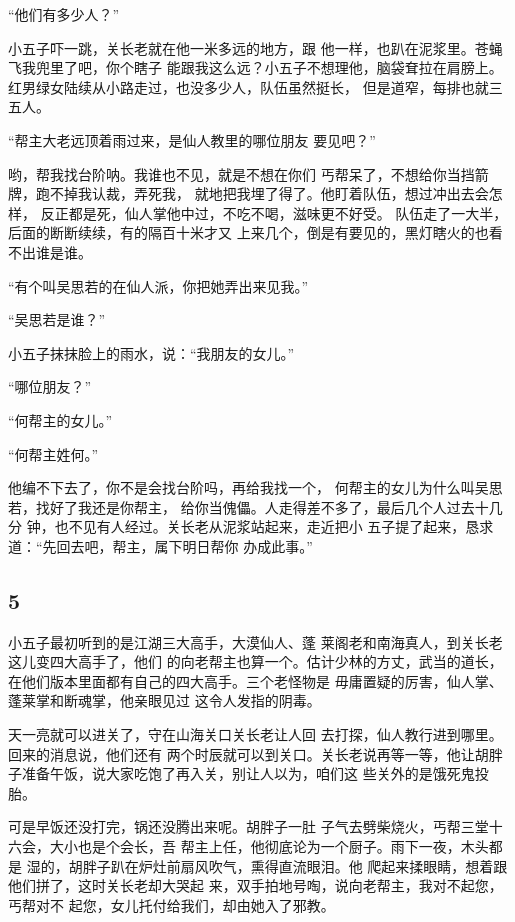 “他们有多少人？”

小五子吓一跳，关长老就在他一米多远的地方，跟
他一样，也趴在泥浆里。苍蝇飞我兜里了吧，你个瞎子
能跟我这么远？小五子不想理他，脑袋耷拉在肩膀上。
红男绿女陆续从小路走过，也没多少人，队伍虽然挺长，
但是道窄，每排也就三五人。

“帮主大老远顶着雨过来，是仙人教里的哪位朋友
要见吧？”

哟，帮我找台阶呐。我谁也不见，就是不想在你们
丐帮呆了，不想给你当挡箭牌，跑不掉我认裁，弄死我，
就地把我埋了得了。他盯着队伍，想过冲出去会怎样，
反正都是死，仙人掌他中过，不吃不喝，滋味更不好受。
队伍走了一大半，后面的断断续续，有的隔百十米才又
上来几个，倒是有要见的，黑灯瞎火的也看不出谁是谁。

“有个叫吴思若的在仙人派，你把她弄出来见我。”

“吴思若是谁？”

小五子抹抹脸上的雨水，说：“我朋友的女儿。”

“哪位朋友？”

“何帮主的女儿。”

“何帮主姓何。”

他编不下去了，你不是会找台阶吗，再给我找一个，
何帮主的女儿为什么叫吴思若，找好了我还是你帮主，
给你当傀儡。人走得差不多了，最后几个人过去十几分
钟，也不见有人经过。关长老从泥浆站起来，走近把小
五子提了起来，恳求道：“先回去吧，帮主，属下明日帮你
办成此事。”
\newline

{\centering\subsection{5}}

小五子最初听到的是江湖三大高手，大漠仙人、蓬
莱阁老和南海真人，到关长老这儿变四大高手了，他们
的向老帮主也算一个。估计少林的方丈，武当的道长，
在他们版本里面都有自己的四大高手。三个老怪物是
毋庸置疑的厉害，仙人掌、蓬莱掌和断魂掌，他亲眼见过
这令人发指的阴毒。

天一亮就可以进关了，守在山海关口关长老让人回
去打探，仙人教行进到哪里。回来的消息说，他们还有
两个时辰就可以到关口。关长老说再等一等，他让胡胖
子准备午饭，说大家吃饱了再入关，别让人以为，咱们这
些关外的是饿死鬼投胎。

可是早饭还没打完，锅还没腾出来呢。胡胖子一肚
子气去劈柴烧火，丐帮三堂十六会，大小也是个会长，吾
帮主上任，他彻底论为一个厨子。雨下一夜，木头都是
湿的，胡胖子趴在炉灶前扇风吹气，熏得直流眼泪。他
爬起来揉眼睛，想着跟他们拼了，这时关长老却大哭起
来，双手拍地号啕，说向老帮主，我对不起您，丐帮对不
起您，女儿托付给我们，却由她入了邪教。

